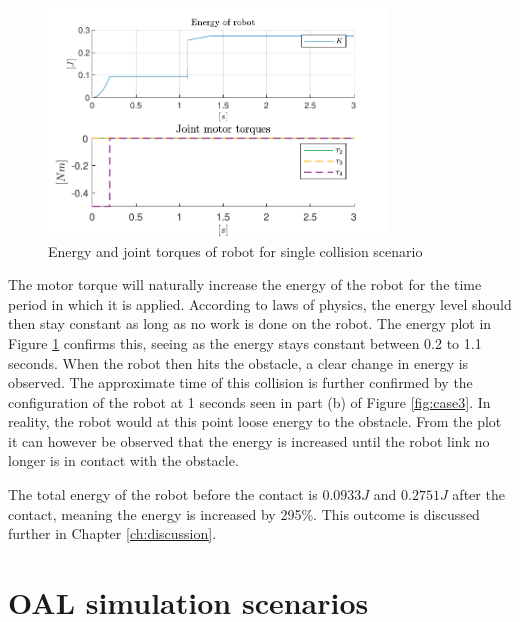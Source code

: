 \begin{figure}[H]
    \centering
    
    \includegraphics[width=0.8\textwidth]{figures/case-3/energy.pdf}

    \caption{Energy and joint torques of robot for single collision scenario}
    \label{fig:case3-plot}
\end{figure}


The motor torque will naturally increase the energy of the robot for the time period in which it is applied. According to laws of physics, the energy level should then stay constant as long as no work is done on the robot. The energy plot in Figure \ref{fig:case3-plot} confirms this, seeing as the energy stays constant between 0.2 to 1.1 seconds. When the robot then hits the obstacle, a clear change in energy is observed. The approximate time of this collision is further confirmed by the configuration of the robot at 1 seconds seen in part (b) of Figure \ref{fig:case3}.
In reality, the robot would at this point loose energy to the obstacle. From the plot it can however be observed that the energy is increased until the robot link no longer is in contact with the obstacle.

The total energy of the robot before the contact is $0.0933J$ and $0.2751J$ after the contact, meaning the energy is increased by 295\%. This outcome is discussed further in Chapter \ref{ch:discussion}.



\section{OAL simulation scenarios}

